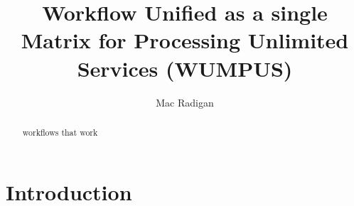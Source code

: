 \documentclass{article}[11pt]
\begin{document}
\title{Workflow Unified as a single Matrix for Processing Unlimited Services (WUMPUS)}
\author{Mac Radigan}
\date{} %
\doublespacing

\maketitle

\begin{abstract}\centering
workflows that work
\end{abstract}

\tableofcontents
\listofalgorithms
\newpage

\section{Introduction}
\end{document}
